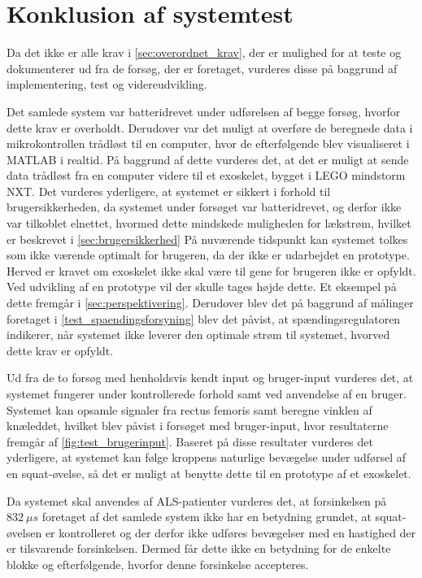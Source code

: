 \section{Konklusion af systemtest}
Da det ikke er alle krav i \autoref{sec:overordnet_krav}, der er mulighed for at teste og dokumenterer ud fra de forsøg, der er foretaget, vurderes disse på baggrund af implementering, test og videreudvikling. 

Det samlede system var batteridrevet under udførelsen af begge forsøg, hvorfor dette krav er overholdt. Derudover var det muligt at overføre de beregnede data i mikrokontrollen trådløst til en computer, hvor de efterfølgende blev visualiseret i MATLAB i realtid. På baggrund af dette vurderes det, at det er muligt at sende data trådløst fra en computer videre til et exoskelet, bygget i LEGO mindstorm NXT. Det vurderes yderligere, at systemet er sikkert i forhold til brugersikkerheden, da systemet under forsøget var batteridrevet, og derfor ikke var tilkoblet elnettet, hvormed dette mindskede muligheden for lækstrøm, hvilket er beskrevet i \autoref{sec:brugersikkerhed}
På nuværende tidspunkt kan systemet tolkes som ikke værende optimalt for brugeren, da der ikke er udarbejdet en prototype. Herved er kravet om exoskelet ikke skal være til gene for brugeren ikke er opfyldt. Ved udvikling af en prototype vil der skulle tages højde dette. Et eksempel på dette fremgår i \autoref{sec:perspektivering}. 
Derudover blev det på baggrund af målinger foretaget i \autoref{test_spaendingsforsyning} blev det påvist, at spændingsregulatoren indikerer, når systemet ikke leverer den optimale strøm til systemet, hvorved dette krav er opfyldt. 

Ud fra de to forsøg med henholdsvis kendt input og bruger-input vurderes det, at systemet fungerer under kontrollerede forhold samt ved anvendelse af en bruger. Systemet kan opsamle signaler fra rectus femoris samt beregne vinklen af knæleddet, hvilket blev påvist i forsøget med bruger-input, hvor resultaterne fremgår af \autoref{fig:test_brugerinput}. Baseret på disse resultater vurderes det yderligere, at systemet kan følge kroppens naturlige bevægelse under udførsel af en squat-øvelse, så det er muligt at benytte dette til en prototype af et exoskelet.  

Da systemet skal anvendes af ALS-patienter vurderes det, at forsinkelsen på $832~\mu s$ foretaget af det samlede system ikke har en betydning grundet, at squat-øvelsen er kontrolleret og der derfor ikke udføres bevægelser med en hastighed der er tilsvarende forsinkelsen. Dermed får dette ikke en betydning for de enkelte blokke og efterfølgende, hvorfor denne forsinkelse accepteres. 

